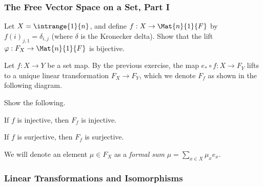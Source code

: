 \subsubsection*{The Free Vector Space on a Set, Part I}

\begin{exercises}
\ResumeExercises
\item
Let $X = \intrange{1}{n}$, and define $f : X \rightarrow \Mat{n}{1}{F}$ by $f(i)_{j,1} = \delta_{i,j}$ (where $\delta$ is the Kronecker delta). Show that the lift $\varphi : F_X \rightarrow \Mat{n}{1}{F}$ is bijective.

\item
Let $f : X \rightarrow Y$ be a set map. By the previous exercise, the map $e_\ast \circ f : X \rightarrow F_Y$ lifts to a unique linear transformation $F_X \rightarrow F_Y$, which we denote $F_f$ as shown in the following diagram.
\begin{center}
\end{center}
Show the following.
\begin{enumerate*}
\item If $f$ is injective, then $F_f$ is injective.
\item If $f$ is surjective, then $F_f$ is surjective.
\end{enumerate*}

\PauseExercises
\end{exercises}

We will denote an element $\mu \in F_X$ as a \emph{formal sum} $\mu = \sum_{x \in X} \mu_x e_x$.

\subsubsection*{Linear Transformations and Isomorphisms}


